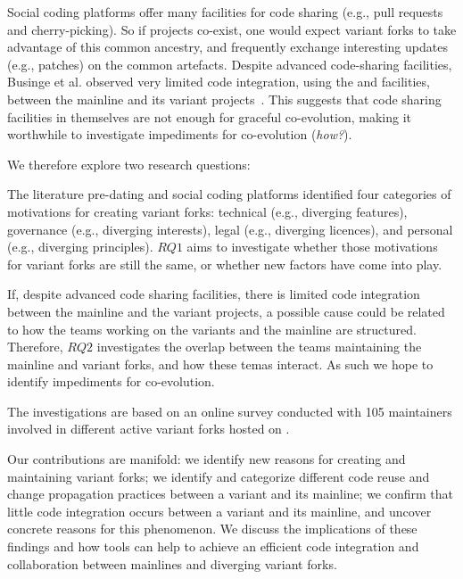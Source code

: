 Social coding platforms offer many facilities for code sharing (e.g., pull requests and cherry-picking).
So if projects co-exist, one would expect variant forks to take advantage of this common ancestry, and frequently exchange interesting updates (e.g., patches) on the common artefacts.
Despite advanced code-sharing facilities, Businge et al. observed very limited code integration, using the \git and \gh facilities, between the mainline and its variant projects~\cite{businge:emse:2021}.
This suggests that code sharing facilities in themselves are not enough for graceful co-evolution, making it worthwhile to investigate impediments for co-evolution (\textit{how?}).

\noindent
We therefore explore two research questions:

\textit{\textbf{\RQOne}}
The literature pre-dating \git and social coding platforms identified four categories of motivations for creating variant forks: technical (e.g., diverging features), governance (e.g., diverging interests), legal (e.g., diverging licences), and personal (e.g., diverging principles).
$RQ1$ aims to investigate whether those motivations for variant forks are still the same, or whether new factors have come into play. 

\textit{\textbf{\RQTwo}}
If, despite advanced code sharing facilities, there is limited code integration between the mainline and the variant projects, a possible cause could be related to how the teams working on the variants and the mainline are structured.
Therefore, $RQ2$ investigates the overlap between the teams maintaining the mainline and variant forks, and how these temas interact.
As such we hope to identify impediments for co-evolution.


The investigations are based on an online survey conducted with 105 maintainers involved in different active variant forks hosted on \gh.

Our contributions are manifold:
we identify new reasons for creating and maintaining variant forks;
we identify and categorize different code reuse and change propagation practices between a variant and its mainline;
we confirm that little code integration occurs between a variant and its mainline, and uncover concrete reasons for this phenomenon.
We discuss the implications of these findings and how tools can help to achieve an efficient code integration and collaboration between mainlines and diverging variant forks.



